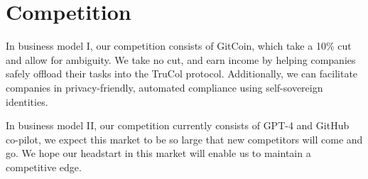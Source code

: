 \vspace{-0.16cm}
\section{Competition}
\vspace{-0.15cm}
In business model I, our competition consists of GitCoin, which take a 10\% cut and allow for ambiguity. We take no cut, and earn income by helping companies safely offload their tasks into the TruCol protocol. Additionally, we can facilitate companies in privacy-friendly, automated compliance using self-sovereign identities.

\noindent In business model II, our competition currently consists of GPT-4 and GitHub co-pilot, we expect this market to be so large that new competitors will come and go. We hope our headstart in this market will enable us to maintain a competitive edge.
